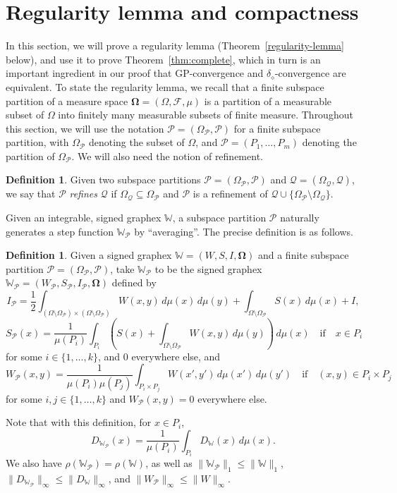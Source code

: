 \documentclass{amsart}
\numberwithin{equation}{section}
\numberwithin{figure}{section}
\theoremstyle{definition}
\newtheorem{definition}[theorem]{Definition}
\theoremstyle{remark}
\newcommand{\bOmega}{{\mathbf{\Omega}}}
\newcommand{\cP}{\mathcal{P}}
\newcommand{\cQ}{\mathcal{Q}}
\newcommand{\cW}{\mathbb{W}}
\newcommand{\cF}{\mathcal{F}}
\newcommand{\sP}{\mathscr{P}}
\newcommand{\sQ}{\mathscr{Q}}
\def\delGP{\delta_\diamond}
\begin{document}
\section{Regularity lemma and compactness} \label{sec:reg}

In this section, we will prove a regularity lemma
(Theorem~\ref{regularity-lemma} below), and use it to prove
Theorem~\ref{thm:complete}, which in turn is an important ingredient in our
proof that GP-convergence and $\delGP$-convergence are equivalent. To state
the regularity lemma, we recall that a finite subspace partition of a measure
space $\bOmega=(\Omega,\cF,\mu)$ is a partition of a measurable subset of
$\Omega$ into finitely many measurable subsets of finite measure. Throughout
this section, we will use the notation $\sP=(\Omega_{\sP},\cP)$ for a finite
subspace partition, with $\Omega_{\sP}$ denoting the subset of $\Omega$, and
$\cP=(P_1,\dots,P_m)$ denoting the partition of $\Omega_{\sP}$. We will also
need the notion of refinement.
\begin{definition}
Given two subspace partitions $\mathscr{P} = (\Omega_{\sP},\cP)$ and
$\sQ=(\Omega_{\cQ},\cQ)$, we say that $\sP$ \emph{refines} $\sQ$ if
$\Omega_{\cQ} \subseteq \Omega_{\sP}$ and $\cP$ is a refinement of $\cQ \cup
\{\Omega_{\sP} \setminus \Omega_{\cQ}\}$.
\end{definition}

Given an integrable, signed graphex $\cW$, a subspace partition $\sP$
naturally generates a step function $\cW_{\sP}$ by ``averaging''. The precise
definition is as follows.

\begin{definition}
Given a signed graphex $\cW=(W,S,I,\bOmega)$ and a finite subspace partition
$\sP=(\Omega_\sP,\cP)$, take $\cW_\sP$ to be the signed graphex
$\cW_\sP=(W_\sP,S_\sP,I_\sP,\bOmega)$ defined by
\[
I_\sP= \frac{1}{2}\int_{(\Omega \setminus \Omega_{\sP})\times (\Omega \setminus \Omega_{\sP})} W(x,y)\,d\mu(x) \,d\mu(y) + \int_{\Omega \setminus \Omega_{\sP}}S(x)\,d\mu(x)+I,
\]
\[
S_{\sP}(x)=\frac{1}{\mu(P_i)}\int_{P_i} \left(S(x)+\int_{\Omega \setminus \Omega_{\sP}}W(x,y)\,d\mu(y) \right)\,d\mu(x)
\quad\text{if}\quad x \in P_i
\]
for some $i\in\{1,\dots,k\}$, and $0$ everywhere else,
and
\[
W_{\sP}(x,y)=\frac1{\mu(P_i)\mu(P_j)}\int_{P_i \times P_j}W(x',y')\,d\mu(x')\,d\mu(y')\quad\text{if}\quad(x,y)\in P_i\times P_j
\]
for some $i,j\in \{1,\dots,k\}$ and $W_{\sP}(x,y)=0$ everywhere else.
\end{definition}
Note that with this definition, for $x \in P_i$,
\[D_{\cW_\sP}(x)=\frac{1}{\mu(P_i)} \int_{P_i} D_\cW(x) \,d\mu(x)
.\] We also have $\rho(\cW_\sP)=\rho(\cW)$, as well as
$\|\cW_\cP\|_1\leq\|\cW\|_1$, $\|D_{\cW_\sP}\|_\infty\leq \|D_\cW\|_\infty$,
and $\|W_\sP\|_\infty\leq \|W\|_\infty$.
\end{document}

